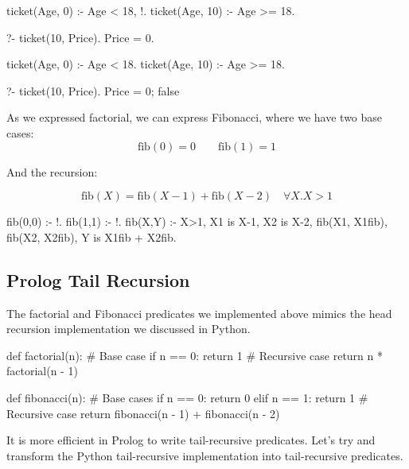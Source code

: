 \begin{codeblock}
ticket(Age, 0)  :- Age < 18, !.
ticket(Age, 10) :- Age >= 18.

?- ticket(10, Price).
Price = 0.
\end{codeblock}


\begin{codeblock}
ticket(Age, 0)  :- Age < 18.
ticket(Age, 10) :- Age >= 18.

?- ticket(10, Price).
Price = 0;
false
\end{codeblock}

As we expressed factorial, we can express Fibonacci, where we have two base cases:
\[
\text{fib}(0) = 0 \qquad \text{fib}(1) = 1 
\]

And the recursion:

\[
\text{fib}(X) = \text{fib}(X-1) + \text{fib}(X-2) \quad \forall X. X > 1
\]

\begin{codeblock}
fib(0,0) :- !.
fib(1,1) :- !.
fib(X,Y) :-
    X>1,
    X1 is X-1,
    X2 is X-2,
    fib(X1, X1fib),
    fib(X2, X2fib),
    Y is X1fib + X2fib.
\end{codeblock}

\subsection{Prolog Tail Recursion}

The factorial and Fibonacci predicates we implemented above mimics the head recursion implementation we discussed in Python.

\begin{codeblock}
def factorial(n):
    # Base case
    if n == 0:
        return 1
    # Recursive case
    return n * factorial(n - 1)
\end{codeblock}

\begin{codeblock}
def fibonacci(n):
    # Base cases
    if n == 0:
        return 0
    elif n == 1:
        return 1
    # Recursive case
    return fibonacci(n - 1) + fibonacci(n - 2)
\end{codeblock}

It is more efficient in Prolog to write tail-recursive predicates. Let's try and transform the Python tail-recursive implementation into tail-recursive predicates.


